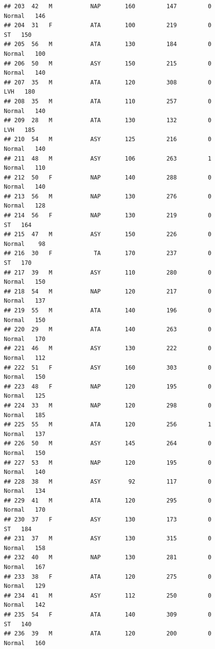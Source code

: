 \documentclass[
]{article}
\begin{document}
\begin{verbatim}
## 203  42   M           NAP       160         147         0     Normal   146
## 204  31   F           ATA       100         219         0         ST   150
## 205  56   M           ATA       130         184         0     Normal   100
## 206  50   M           ASY       150         215         0     Normal   140
## 207  35   M           ATA       120         308         0        LVH   180
## 208  35   M           ATA       110         257         0     Normal   140
## 209  28   M           ATA       130         132         0        LVH   185
## 210  54   M           ASY       125         216         0     Normal   140
## 211  48   M           ASY       106         263         1     Normal   110
## 212  50   F           NAP       140         288         0     Normal   140
## 213  56   M           NAP       130         276         0     Normal   128
## 214  56   F           NAP       130         219         0         ST   164
## 215  47   M           ASY       150         226         0     Normal    98
## 216  30   F            TA       170         237         0         ST   170
## 217  39   M           ASY       110         280         0     Normal   150
## 218  54   M           NAP       120         217         0     Normal   137
## 219  55   M           ATA       140         196         0     Normal   150
## 220  29   M           ATA       140         263         0     Normal   170
## 221  46   M           ASY       130         222         0     Normal   112
## 222  51   F           ASY       160         303         0     Normal   150
## 223  48   F           NAP       120         195         0     Normal   125
## 224  33   M           NAP       120         298         0     Normal   185
## 225  55   M           ATA       120         256         1     Normal   137
## 226  50   M           ASY       145         264         0     Normal   150
## 227  53   M           NAP       120         195         0     Normal   140
## 228  38   M           ASY        92         117         0     Normal   134
## 229  41   M           ATA       120         295         0     Normal   170
## 230  37   F           ASY       130         173         0         ST   184
## 231  37   M           ASY       130         315         0     Normal   158
## 232  40   M           NAP       130         281         0     Normal   167
## 233  38   F           ATA       120         275         0     Normal   129
## 234  41   M           ASY       112         250         0     Normal   142
## 235  54   F           ATA       140         309         0         ST   140
## 236  39   M           ATA       120         200         0     Normal   160

\end{verbatim}
\end{document}
